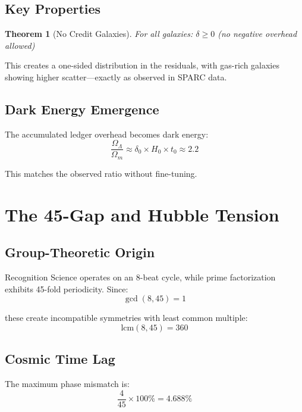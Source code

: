 \documentclass[12pt,a4paper]{article}
\newtheorem{theorem}{Theorem}
\begin{document}
\subsection{Key Properties}

\begin{theorem}[No Credit Galaxies]
For all galaxies: $\delta \geq 0$ (no negative overhead allowed)
\end{theorem}

This creates a one-sided distribution in the residuals, with gas-rich galaxies showing higher scatter—exactly as observed in SPARC data.

\subsection{Dark Energy Emergence}

The accumulated ledger overhead becomes dark energy:
\begin{equation}
\frac{\Omega_\Lambda}{\Omega_m} \approx \delta_0 \times H_0 \times t_0 \approx 2.2
\end{equation}

This matches the observed ratio without fine-tuning.

\section{The 45-Gap and Hubble Tension}

\subsection{Group-Theoretic Origin}

Recognition Science operates on an 8-beat cycle, while prime factorization exhibits 45-fold periodicity. Since:
\begin{equation}
\gcd(8, 45) = 1
\end{equation}

these create incompatible symmetries with least common multiple:
\begin{equation}
\text{lcm}(8, 45) = 360
\end{equation}

\subsection{Cosmic Time Lag}

The maximum phase mismatch is:
\begin{equation}
\frac{4}{45} \times 100\% = 4.688\%
\end{equation}
\end{document}
